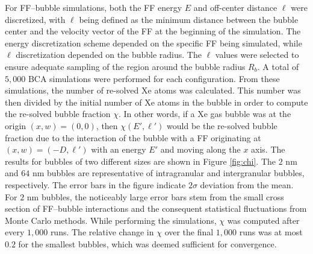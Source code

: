 \documentclass[review]{elsarticle}
\begin{document}
For FF--bubble simulations, both the FF energy $E$ and off-center distance $\ell$ were discretized, with $\ell$ being defined as the minimum distance between the bubble center and the velocity vector of the FF at the beginning of the simulation. The energy discretization scheme depended on the specific FF being simulated, while $\ell$ discretization depended on the bubble radius. The $\ell$ values were selected to ensure adequate sampling of the region around the bubble radius $R_b$. A total of $5,000$ BCA simulations were performed for each configuration. From these simulations, the number of re-solved Xe atoms was calculated. This number was then divided by the initial number of Xe atoms in the bubble in order to compute the re-solved bubble fraction $\chi$. In other words, if a Xe gas bubble was at the origin $(x, w) = (0, 0)$, then $\chi(E', \ell')$ would be the re-solved bubble fraction due to the interaction of the bubble with a FF originating at $(x, w) = (-D, \ell')$ with an energy $E'$ and moving along the $x$ axis. The results for bubbles of two different sizes are shown in Figure \ref{fig:chi}. The $2$ nm and $64$ nm bubbles are representative of intragranular and intergranular bubbles, respectively. The error bars in the figure indicate $2 \sigma$ deviation from the mean. For $2$ nm bubbles, the noticeably large error bars stem from the small cross section of FF--bubble interactions and the consequent statistical fluctuations from Monte Carlo methods. While performing the simulations, $\chi$ was computed after every $1,000$ runs. The relative change in $\chi$ over the final $1,000$ runs was at most $0.2$ for the smallest bubbles, which was deemed sufficient for convergence.
\end{document}
